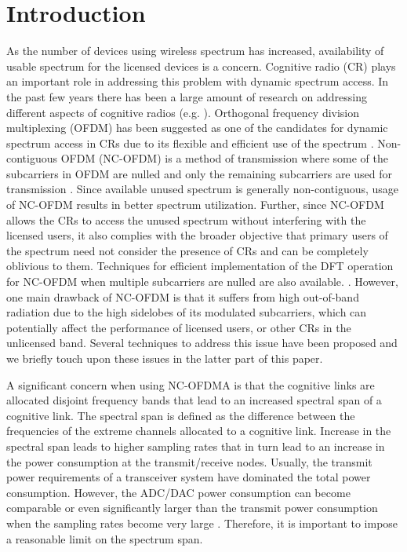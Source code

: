 \documentclass[conference]{IEEEtran}
\begin{document}
\section{Introduction}
As the number of devices using wireless spectrum has increased, availability of usable spectrum for the licensed devices is a concern. Cognitive radio (CR) plays an important role in addressing this problem with dynamic spectrum access. In the past few years there has been a large amount of research on addressing different aspects of cognitive radios (e.g. \cite{ mitola99cognet, pricognet, haykin05cognetbrain, thomas05cognet,  ileri08dsamodel, liang08sense, srini07cognetdsa, Cesana11routing, cheng07joint, NazmulWiOpt}). Orthogonal frequency division multiplexing (OFDM)  has been suggested as one of the candidates for dynamic spectrum access in CRs due to its flexible and efficient use of the spectrum \cite{weiss04}. Non-contiguous OFDM (NC-OFDM) is a method of transmission where some of the subcarriers in OFDM are nulled and  only the remaining subcarriers are used for transmission \cite{rajbanshi06ncofdmrx, UCSB1, UCSB2, NCOFDM_Implementation}. Since available unused spectrum is generally non-contiguous,  usage of  NC-OFDM  results in better spectrum utilization. Further, since NC-OFDM allows the CRs to access the unused spectrum without interfering with the licensed users, it also complies with the broader objective  that primary users of the spectrum need not consider the presence of CRs and can be completely oblivious to them.
Techniques for efficient implementation of the DFT operation for NC-OFDM when multiple subcarriers are nulled are also available. \cite{rajbanshi06ncofdmrx}. However, one main drawback of NC-OFDM is that it suffers from high out-of-band radiation due to the high sidelobes of its modulated subcarriers, which can potentially affect the performance of licensed users, or other CRs in the unlicensed band. Several techniques to address this issue have been proposed and we briefly touch upon these issues in the latter part of this paper. 

A significant concern when using NC-OFDMA is that the cognitive links are allocated disjoint frequency bands that lead to an increased spectral span of a cognitive link. The spectral span is defined as the difference between the frequencies of the extreme channels allocated to a cognitive link. Increase in the spectral span leads to higher sampling rates that in turn lead to an increase in the power consumption at the transmit/receive nodes.
Usually, the transmit power requirements of a transceiver system have dominated the total power consumption. However, the ADC/DAC power consumption can become comparable or even significantly larger than the transmit power consumption when the sampling rates become very large \cite{Nazmul_NCOFDM1}. Therefore, it is important to impose a reasonable limit on the spectrum span.
\end{document}
